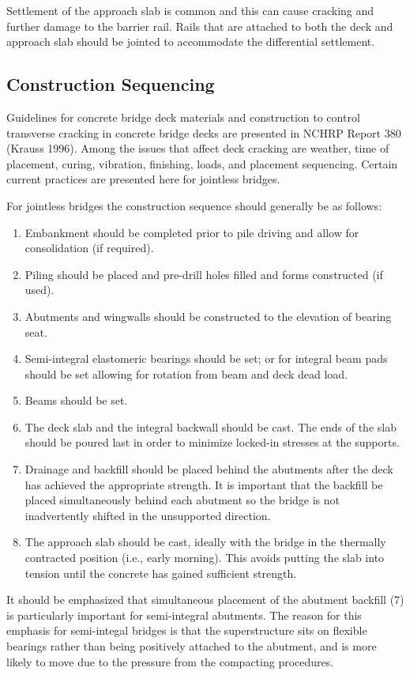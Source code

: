 Settlement of the approach slab is common and this can cause cracking and further damage to the barrier rail.
Rails that are attached to both the deck and approach slab should be jointed to accommodate the differential
settlement.

\subsection{Construction Sequencing}
\label{subsec:construction-sequencing}
Guidelines for concrete bridge deck materials and construction to control transverse cracking in concrete bridge
decks are presented in NCHRP Report 380 (Krauss 1996). Among the issues that affect deck cracking are weather,
time of placement, curing, vibration, finishing, loads, and placement sequencing. Certain current practices are
presented here for jointless bridges.

For jointless bridges the construction sequence should generally be as follows:
\begin{enumerate}
  \item Embankment should be completed prior to pile driving and allow for consolidation (if required).
  \item Piling should be placed and pre-drill holes filled and forms constructed (if used).
  \item Abutments and wingwalls should be constructed to the elevation of bearing seat.
  \item Semi-integral elastomeric bearings should be set; or for integral beam pads should be set allowing for
rotation from beam and deck dead load.
  \item Beams should be set.
  \item The deck slab and the integral backwall should be cast. The ends of the slab should be poured last in
order to minimize locked-in stresses at the supports.
  \item Drainage and backfill should be placed behind the abutments after the deck has achieved the appropriate
strength. It is important that the backfill be placed simultaneously behind each abutment so the bridge is
not inadvertently shifted in the unsupported direction.
  \item The approach slab should be cast, ideally with the bridge in the thermally contracted position (i.e., early
morning). This avoids putting the slab into tension until the concrete has gained sufficient strength.
\end{enumerate}

It should be emphasized that simultaneous placement of the abutment backfill (7) is particularly important for
semi-integral abutments. The reason for this emphasis for semi-integal bridges is that the superstructure sits on
flexible bearings rather than being positively attached to the abutment, and is more likely to move due to the pressure
from the compacting procedures.

